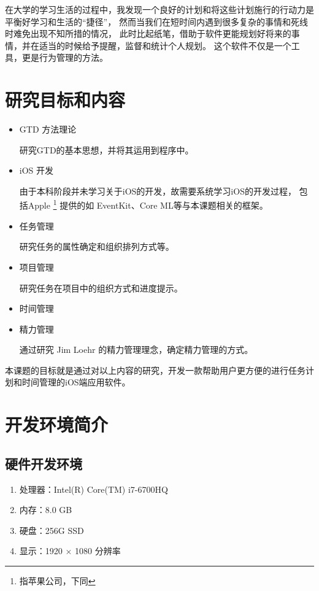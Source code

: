 在大学的学习生活的过程中，我发现一个良好的计划和将这些计划施行的行动力是平衡好学习和生活的“捷径”，
然而当我们在短时间内遇到很多复杂的事情和死线时难免出现不知所措的情况\parencite{mu2015time}，
此时比起纸笔，借助于软件更能规划好将来的事情，并在适当的时候给予提醒，监督和统计个人规划\parencite{mcgonigal2011willpower}。 
这个软件不仅是一个工具，更是行为管理的方法。

\section{研究目标和内容}
\begin{itemize}
	\item GTD 方法理论
	
	研究GTD的基本思想，并将其运用到程序中。
	\item iOS 开发
	
	由于本科阶段并未学习关于iOS的开发，故需要系统学习iOS的开发过程，
	包括Apple \footnote{指苹果公司，下同} 提供的如 EventKit、Core ML等与本课题相关的框架。
	\item 任务管理
	
	研究任务的属性确定和组织排列方式等。
	\item 项目管理
	
	研究任务在项目中的组织方式和进度提示。
	\item 时间管理
	\item 精力管理
	
	通过研究 Jim Loehr 的精力管理理念，确定精力管理的方式。
	
\end{itemize}

本课题的目标就是通过对以上内容的研究，开发一款帮助用户更方便的进行任务计划和时间管理的iOS端应用软件。

\section{开发环境简介}

\subsection{硬件开发环境}

\begin{enumerate}
	\item 处理器：Intel(R) Core(TM) i7-6700HQ
	\item 内存：8.0 GB
	\item 硬盘：256G SSD
	\item 显示：1920 $\times$ 1080 分辨率
\end{enumerate}

